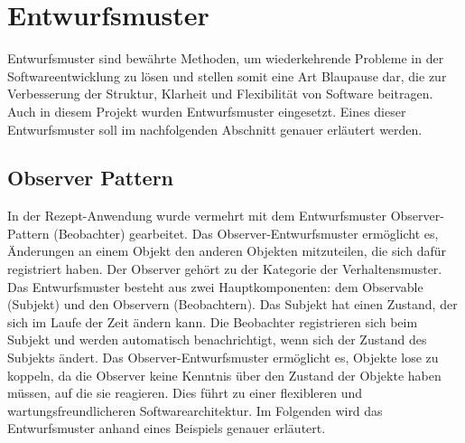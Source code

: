 \chapter{Entwurfsmuster}
Entwurfsmuster sind bewährte Methoden, um wiederkehrende Probleme in der Softwareentwicklung zu lösen und stellen somit eine Art Blaupause dar, die zur Verbesserung der Struktur, Klarheit und Flexibilität von Software beitragen. Auch in diesem Projekt wurden Entwurfsmuster eingesetzt. Eines dieser Entwurfsmuster soll im nachfolgenden Abschnitt genauer erläutert werden.

\section{Observer Pattern}
In der Rezept-Anwendung wurde vermehrt mit dem Entwurfsmuster Observer-Pattern (Beobachter) gearbeitet. Das Observer-Entwurfsmuster ermöglicht es, Änderungen an einem Objekt den anderen Objekten mitzuteilen, die sich dafür registriert haben. Der Observer gehört zu der Kategorie der Verhaltensmuster. Das Entwurfsmuster besteht aus zwei Hauptkomponenten: dem Observable (Subjekt) und den Observern (Beobachtern). 
Das Subjekt hat einen Zustand, der sich im Laufe der Zeit ändern kann. Die Beobachter registrieren sich beim Subjekt und werden automatisch benachrichtigt, wenn sich der Zustand des Subjekts ändert. Das Observer-Entwurfsmuster ermöglicht es, Objekte lose zu koppeln, da die Observer keine Kenntnis über den Zustand der Objekte haben müssen, auf die sie reagieren. Dies führt zu einer flexibleren und wartungsfreundlicheren Softwarearchitektur.
Im Folgenden wird das Entwurfsmuster anhand eines Beispiels genauer erläutert. 

